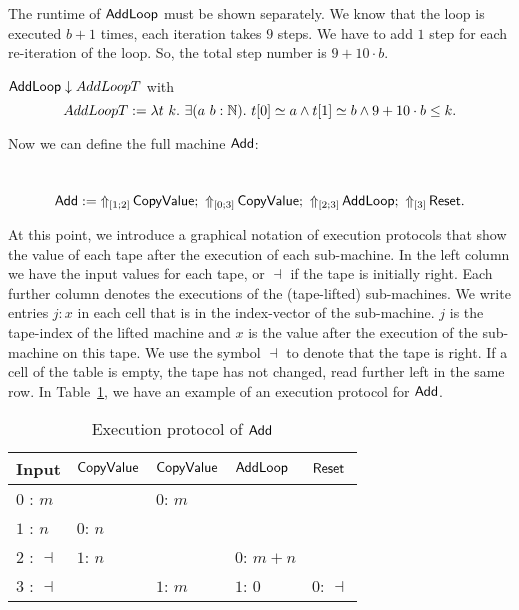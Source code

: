 The runtime of $\MS{AddLoop}$ must be shown separately.  We know that the loop is executed $b+1$ times, each iteration takes $9$ steps.  We have to
add $1$ step for each re-iteration of the loop.  So, the total step number is $9+10 \cdot b$.
\begin{lemma}
  \label{lem:Add_Loop_TerminatesIn}
  $\MS{AddLoop} \downarrow AddLoopT$ with
  \[
    AddLoopT := \lambda t~k.~\exists (a~b:\Nat).~t[0] \simeq a \land t[1] \simeq b \land 9+10 \cdot b \leq k.
  \]
\end{lemma}

Now we can define the full machine $\MS{Add}$:
\begin{definition}[$\MS{Add}$]
  \label{def:Add}
  ~
  \[
    \MS{Add} :=
    \LiftTapes{\MS{CopyValue}}{\Vector{1;2}} \Seq
    \LiftTapes{\MS{CopyValue}}{\Vector{0;3}} \Seq
    \LiftTapes{\MS{AddLoop}}{\Vector{2;3}} \Seq
    \LiftTapes{\MS{Reset}}{\Vector{3}}.
  \]
\end{definition}

At this point, we introduce a graphical notation of execution protocols that show the value of each tape after the execution of each sub-machine.  In
the left column we have the input values for each tape, or $\dashv$ if the tape is initially right.  Each further column denotes the executions of the
(tape-lifted) sub-machines.  We write entries $j: x$ in each cell that is in the index-vector of the sub-machine.  $j$ is the tape-index of the lifted
machine and $x$ is the value after the execution of the sub-machine on this tape.  We use the symbol $\dashv$ to denote that the tape is right.  If a
cell of the table is empty, the tape has not changed, read further left in the same row.  In Table~\ref{tab:exec-Add}, we have an example of an
execution protocol for $\MS{Add}$.

\begin{table}[h]
  \centering
  \begin{tabular}{l||l|l|l|l}
    Input          & $\MS{CopyValue}$ & $\MS{CopyValue}$ & $\MS{AddLoop}$ & $\MS{Reset}$ \\ \hline
    $0$ : $m$      &                  & $0$: $m$         &                &              \\
    $1$ : $n$      & $0$: $n$         &                  &                &              \\
    $2$ : $\dashv$ & $1$: $n$         &                  & $0$: $m+n$     &              \\
    $3$ : $\dashv$ &                  & $1$: $m$         & $1$: $0$       & $0$: $\dashv$\\
  \end{tabular}
  \caption{Execution protocol of $\MS{Add}$}
  \label{tab:exec-Add}
\end{table}


